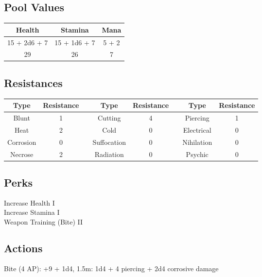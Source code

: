 \subsection{Pool Values}
\bigbreak
\begin{minipage}[H]{1\textwidth}
    \centering
    \begin{tabular}[c]{|c | c | c|}
        \hline
        Health & Stamina & Mana\\
        \hline
        15 + 2d6 + 7 & 15 + 1d6 + 7 & 5 + 2 \\
        29 & 26 & 7\\
        \hline
    \end{tabular}
\end{minipage}
\noindent

\subsection{Resistances}
\begin{minipage}[H]{1\textwidth}
    \centering
    \begin{tabular}[c]{|c | c | c | c | c | c | c | c|}
        \hline
        Type & Resistance && Type & Resistance && Type & Resistance\\
        \hline
        Blunt & 1 &&
        Cutting & 4 &&
        Piercing & 1\\
        Heat & 2 &&
        Cold & 0 &&
        Electrical & 0\\
        Corrosion & 0 &&
        Suffocation & 0 &&
        Nihilation & 0 \\
        Necrose & 2 &&
        Radiation & 0 &&
        Psychic & 0\\
        \hline
    \end{tabular}
\end{minipage}

\subsection{Perks}
Increase Health I\\
Increase Stamina I\\
Weapon Training (Bite) II\\

\subsection{Actions}
Bite (4 AP): +9 + 1d4, 1.5m: 1d4 + 4 piercing + 2d4 corrosive damage\\

